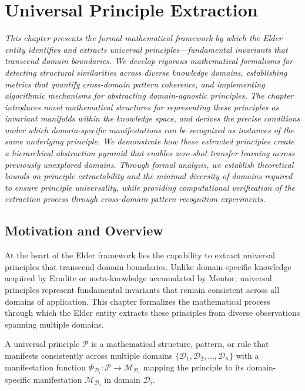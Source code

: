 \chapter{Universal Principle Extraction}

\textit{This chapter presents the formal mathematical framework by which the Elder entity identifies and extracts universal principles—fundamental invariants that transcend domain boundaries. We develop rigorous mathematical formalisms for detecting structural similarities across diverse knowledge domains, establishing metrics that quantify cross-domain pattern coherence, and implementing algorithmic mechanisms for abstracting domain-agnostic principles. The chapter introduces novel mathematical structures for representing these principles as invariant manifolds within the knowledge space, and derives the precise conditions under which domain-specific manifestations can be recognized as instances of the same underlying principle. We demonstrate how these extracted principles create a hierarchical abstraction pyramid that enables zero-shot transfer learning across previously unexplored domains. Through formal analysis, we establish theoretical bounds on principle extractability and the minimal diversity of domains required to ensure principle universality, while providing computational verification of the extraction process through cross-domain pattern recognition experiments.}

\section{Motivation and Overview}

At the heart of the Elder framework lies the capability to extract universal principles that transcend domain boundaries. Unlike domain-specific knowledge acquired by Erudite or meta-knowledge accumulated by Mentor, universal principles represent fundamental invariants that remain consistent across all domains of application. This chapter formalizes the mathematical process through which the Elder entity extracts these principles from diverse observations spanning multiple domains.

\begin{definition}
A universal principle $\mathcal{P}$ is a mathematical structure, pattern, or rule that manifests consistently across multiple domains $\{\mathcal{D}_1, \mathcal{D}_2, \ldots, \mathcal{D}_n\}$ with a manifestation function $\Phi_{\mathcal{D}_i}: \mathcal{P} \rightarrow \mathcal{M}_{\mathcal{D}_i}$ mapping the principle to its domain-specific manifestation $\mathcal{M}_{\mathcal{D}_i}$ in domain $\mathcal{D}_i$.
\end{definition}


